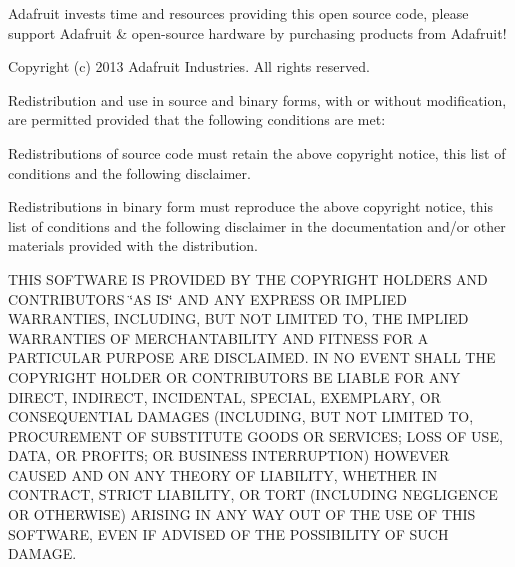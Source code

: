 Adafruit invests time and resources providing this open source code, please support Adafruit \& open-\/source hardware by purchasing products from Adafruit!

Copyright (c) 2013 Adafruit Industries. All rights reserved.

Redistribution and use in source and binary forms, with or without modification, are permitted provided that the following conditions are met\+:


\begin{DoxyItemize}
\item Redistributions of source code must retain the above copyright notice, this list of conditions and the following disclaimer.
\item Redistributions in binary form must reproduce the above copyright notice, this list of conditions and the following disclaimer in the documentation and/or other materials provided with the distribution.
\end{DoxyItemize}

T\+H\+IS S\+O\+F\+T\+W\+A\+RE IS P\+R\+O\+V\+I\+D\+ED BY T\+HE C\+O\+P\+Y\+R\+I\+G\+HT H\+O\+L\+D\+E\+RS A\+ND C\+O\+N\+T\+R\+I\+B\+U\+T\+O\+RS \char`\"{}\+A\+S I\+S\char`\"{} A\+ND A\+NY E\+X\+P\+R\+E\+SS OR I\+M\+P\+L\+I\+ED W\+A\+R\+R\+A\+N\+T\+I\+ES, I\+N\+C\+L\+U\+D\+I\+NG, B\+UT N\+OT L\+I\+M\+I\+T\+ED TO, T\+HE I\+M\+P\+L\+I\+ED W\+A\+R\+R\+A\+N\+T\+I\+ES OF M\+E\+R\+C\+H\+A\+N\+T\+A\+B\+I\+L\+I\+TY A\+ND F\+I\+T\+N\+E\+SS F\+OR A P\+A\+R\+T\+I\+C\+U\+L\+AR P\+U\+R\+P\+O\+SE A\+RE D\+I\+S\+C\+L\+A\+I\+M\+ED. IN NO E\+V\+E\+NT S\+H\+A\+LL T\+HE C\+O\+P\+Y\+R\+I\+G\+HT H\+O\+L\+D\+ER OR C\+O\+N\+T\+R\+I\+B\+U\+T\+O\+RS BE L\+I\+A\+B\+LE F\+OR A\+NY D\+I\+R\+E\+CT, I\+N\+D\+I\+R\+E\+CT, I\+N\+C\+I\+D\+E\+N\+T\+AL, S\+P\+E\+C\+I\+AL, E\+X\+E\+M\+P\+L\+A\+RY, OR C\+O\+N\+S\+E\+Q\+U\+E\+N\+T\+I\+AL D\+A\+M\+A\+G\+ES (I\+N\+C\+L\+U\+D\+I\+NG, B\+UT N\+OT L\+I\+M\+I\+T\+ED TO, P\+R\+O\+C\+U\+R\+E\+M\+E\+NT OF S\+U\+B\+S\+T\+I\+T\+U\+TE G\+O\+O\+DS OR S\+E\+R\+V\+I\+C\+ES; L\+O\+SS OF U\+SE, D\+A\+TA, OR P\+R\+O\+F\+I\+TS; OR B\+U\+S\+I\+N\+E\+SS I\+N\+T\+E\+R\+R\+U\+P\+T\+I\+ON) H\+O\+W\+E\+V\+ER C\+A\+U\+S\+ED A\+ND ON A\+NY T\+H\+E\+O\+RY OF L\+I\+A\+B\+I\+L\+I\+TY, W\+H\+E\+T\+H\+ER IN C\+O\+N\+T\+R\+A\+CT, S\+T\+R\+I\+CT L\+I\+A\+B\+I\+L\+I\+TY, OR T\+O\+RT (I\+N\+C\+L\+U\+D\+I\+NG N\+E\+G\+L\+I\+G\+E\+N\+CE OR O\+T\+H\+E\+R\+W\+I\+SE) A\+R\+I\+S\+I\+NG IN A\+NY W\+AY O\+UT OF T\+HE U\+SE OF T\+H\+IS S\+O\+F\+T\+W\+A\+RE, E\+V\+EN IF A\+D\+V\+I\+S\+ED OF T\+HE P\+O\+S\+S\+I\+B\+I\+L\+I\+TY OF S\+U\+CH D\+A\+M\+A\+GE. 

